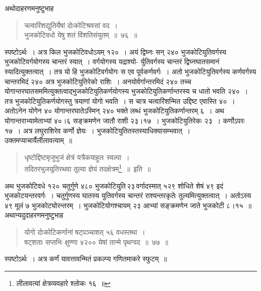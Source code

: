 \documentclass[11pt, openany]{book}
\begin{document}
\vspace{-3mm}
 अथोदाहरणमनुष्टुभाह\textendash 
 \begin{quote}
     \ex
     चत्वारिंशद्युतिर्येषां दोःकोटिश्रवसां वद~।\\
 भुजकोटिवधो येषु शतं विंशतिसंयुतम्~॥~७६~॥~
 \end{quote}
 
स्पष्टोऽर्थः~। अत्र किल भुजकोटिवधोऽयम् १२०~। अयं द्विघ्नः सन् २४० 
भुजकोटियुतिवर्गस्य भुजकोटिवर्गयोगस्य चान्तरं स्यात्~। वर्गयोगस्य यद्राश्यो-
\newpage
\noindent र्युतिवर्गस्य चान्तरं द्विघ्नघातसमानं स्यादित्युक्तत्वात्~। तत्र यो हि
भुजकोटिवर्गयोगः स एव पूर्वकर्णवर्गः~। अतो भुजकोटियुतिवर्गस्य कर्णवर्गस्य 
चान्तरमिदं २४० अत्र भुजकोटियुतिरेको राशिः~। अनयोर्वर्गान्तरमिदं २४० 
तच्च योगान्तरघातसममित्युक्तत्वाद्भुजकोटियुतिकर्णयोगस्य भुजकोटियुतिकर्णान्तरस्य च धातो भवति २४०~। तत्र भुजकोटियुतिकर्णयोगस्तु त्रयाणां 
योगो भवति~। स चात्र चत्वारिंशन्मित उद्दिष्ट एवास्ति ४०~। अतोऽनेन 
योगेन ४० योगान्तरघातेऽस्मिन् २४० भक्ते लब्धं भुजकोटियुतिकर्णान्तरम् ६~। 
अथ योगान्तराभ्यामेताभ्यां ४०।६ सङ्क्रमणेन जातौ राशी २३।१७~। 
भुजकोटियुतिरेकः २३~। कर्णोऽपरः १७~। अत्र लघुराशिरेव कर्णो ज्ञेयः~। 
भुजकोटियुतितस्तस्याधिक्यासम्भवात्~। उक्तमप्याचार्यै{\qt र्लीलावत्याम्}~॥ 

\begin{quote}
    \q
   धृष्टोद्दिष्टमृजुभुजं क्षेत्रं यत्रैकयाहुतः स्वल्पा~। \\
 तदितरभुजयुतिरथवा तुल्या ज्ञेयं तदक्षेत्रम्\renewcommand{\thefootnote}{*}\footnote{लीलावत्यां क्षेत्रव्यवहारे श्लोकः १६~॥}~॥~इति~॥~
\end{quote}
 
 अथ भुजकोटिवधे १२० चतुर्गुणे ४८० भुजकोटियुति\textendash \,२३\textendash \,वर्गादस्मात् ५२९ शोधिते शेषं ४९ इदं भुजकोटयन्तरवर्गः~। चतुर्गुणस्य घातस्य युतिवर्गस्य चान्तरं राश्यन्तरकृतेः तुल्यमित्युक्तत्वात्~। अतोऽस्य ४९ मूलं ७ भुजकोट्योरन्तरम्~। भुजकोटियोगश्चायम् २३ आभ्यां सङ्क्रमणेन जाते भुजकोटी ८।१५~॥ \\

\vspace{-3mm}
 अथान्यदुदाहरणमनुष्टुभाह\textendash 
\begin{quote}
    \ex
      योगो दोःकोटिकर्णानां षट्पञ्चाशत् ५६ वधस्तथा~। \\
 षट्शताः सप्तभिः क्षुण्णा ४२०० येषां तान्मे पृथग्वद~॥~७७~॥~
\end{quote}

स्पष्टोऽर्थः~। अत्र कर्णं यावत्तावन्मितं प्रकल्प्य गणितमाकरे स्फुटम्~॥ 
\newpage
 
\end{document}
